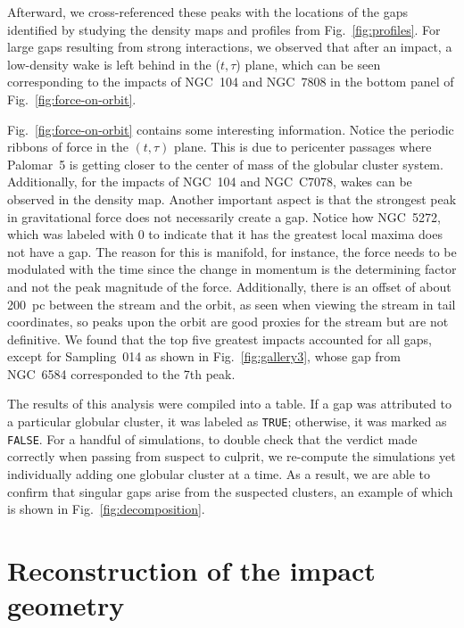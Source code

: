 \documentclass[draft]{aa}
\begin{document}
\begin{appendix}
    Afterward, we cross-referenced these peaks with the locations of the gaps identified by studying the density maps and profiles from Fig.~\ref{fig:profiles}. For large gaps resulting from strong interactions, we observed that after an impact, a low-density wake is left behind in the ($t,\tau$) plane, which can be seen corresponding to the impacts of NGC~104 and NGC~7808 in the bottom panel of Fig.~\ref{fig:force-on-orbit}.



    Fig.~\ref{fig:force-on-orbit} contains some interesting information. Notice the periodic ribbons of force in the $(t,\tau)$ plane. This is due to pericenter passages where Palomar~5 is getting closer to the center of mass of the globular cluster system. Additionally, for the impacts of NGC~104 and NGC~C7078, wakes can be observed in the density map. Another important aspect is that the strongest peak in gravitational force does not necessarily create a gap. Notice how NGC~5272, which was labeled with 0 to indicate that it has the greatest local maxima does not have a gap. The reason for this is manifold, for instance, the force needs to be modulated with the time since the change in momentum is the determining factor and not the peak magnitude of the force.  Additionally, there is an offset of about 200~pc between the stream and the orbit, as seen when viewing the stream in tail coordinates, so peaks upon the orbit are good proxies for the stream but are not definitive. We found that the top five greatest impacts accounted for all gaps, except for Sampling~014 as shown in Fig.~\ref{fig:gallery3}, whose gap from NGC~6584 corresponded to the 7th peak. 

    The results of this analysis were compiled into a table. If a gap was attributed to a particular globular cluster, it was labeled as \texttt{TRUE}; otherwise, it was marked as \texttt{FALSE}. For a handful of simulations, to double check that the verdict made correctly when passing from suspect to culprit, we re-compute the simulations yet individually adding one globular cluster at a time. As a result, we are able to confirm that singular gaps arise from the suspected clusters, an example of which is shown in Fig.~\ref{fig:decomposition}. 



    \section{Reconstruction of the impact geometry} \label{sec:reconstruction}


\end{appendix}
\end{document}
